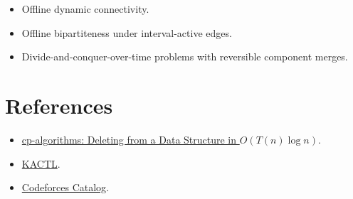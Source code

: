 \begin{itemize}
  \item Offline dynamic connectivity.
  \item Offline bipartiteness under interval-active edges.
  \item Divide-and-conquer-over-time problems with reversible component merges.
\end{itemize}

\section*{References}

\begin{itemize}
  \item \href{https://cp-algorithms.com/data_structures/deleting_in_log_n.html}{cp-algorithms: Deleting from a Data Structure in \(O(T(n)\log n)\)}.
  \item \href{https://github.com/kth-competitive-programming/kactl}{KACTL}.
  \item \href{https://codeforces.com/catalog}{Codeforces Catalog}.
\end{itemize}
